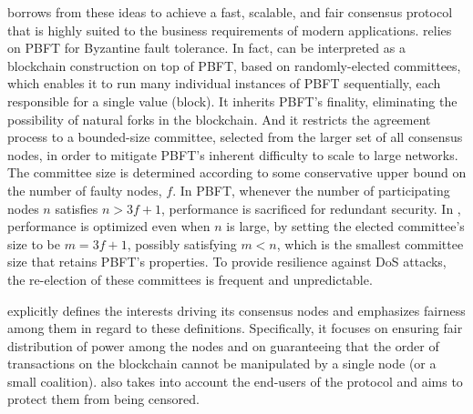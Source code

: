 \name borrows from these ideas to achieve a fast, scalable, and fair consensus protocol that is highly suited to the business requirements of modern applications. \name relies on PBFT for Byzantine fault tolerance. In fact, \name can be interpreted as a blockchain construction on top of PBFT, based on randomly-elected committees, which enables it to run many individual instances of PBFT sequentially, each responsible for a single value (block). It inherits PBFT's finality, eliminating the possibility of natural forks in the blockchain. And it restricts the agreement process to a bounded-size committee, selected from the larger set of all consensus nodes, in order to mitigate PBFT's inherent difficulty to scale to large networks. 
The committee size is determined according to some conservative upper bound on the number of faulty nodes, $f$. In PBFT, whenever the number of participating nodes $n$ satisfies $n > 3f+1$,  performance is sacrificed for redundant security.
In \nameNS, performance is optimized even when $n$ is large, by setting the elected committee's size to be $m=3f+1$, possibly satisfying $m < n$, which is the smallest committee size that retains PBFT's properties. To provide resilience against DoS attacks, the re-election of these committees is frequent and unpredictable. 

\name explicitly defines the interests driving its consensus nodes and emphasizes fairness among them in regard to these definitions. Specifically, it focuses on ensuring fair distribution of power among the nodes and on guaranteeing that the order of transactions on the blockchain cannot be manipulated by a single node (or a small coalition). \name also takes into account the end-users of the protocol and aims to protect them from being censored. 

